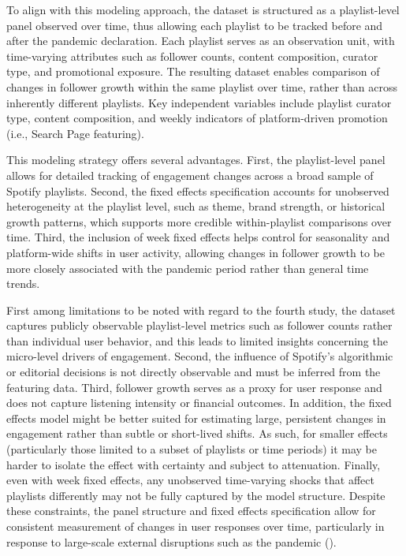 To align with this modeling approach, the dataset is structured as a playlist-level panel observed over time, thus allowing each playlist to be tracked before and after the pandemic declaration. Each playlist serves as an observation unit, with time-varying attributes such as follower counts, content composition, curator type, and promotional exposure. The resulting dataset enables comparison of changes in follower growth within the same playlist over time, rather than across inherently different playlists. Key independent variables include playlist curator type, content composition, and weekly indicators of platform-driven promotion (i.e., Search Page featuring).

This modeling strategy offers several advantages. First, the playlist-level panel allows for detailed tracking of engagement changes across a broad sample of Spotify playlists. Second, the fixed effects specification accounts for unobserved heterogeneity at the playlist level, such as theme, brand strength, or historical growth patterns, which supports more credible within-playlist comparisons over time. Third, the inclusion of week fixed effects helps control for seasonality and platform-wide shifts in user activity, allowing changes in follower growth to be more closely associated with the pandemic period rather than general time trends.

First among limitations to be noted with regard to the fourth study, the dataset captures publicly observable playlist-level metrics such as follower counts rather than individual user behavior, and this leads to limited insights concerning the micro-level drivers of engagement. Second, the influence of Spotify’s algorithmic or editorial decisions is not directly observable and must be inferred from the featuring data. Third, follower growth serves as a proxy for user response and does not capture listening intensity or financial outcomes. In addition, the fixed effects model might be better suited for estimating large, persistent changes in engagement rather than subtle or short-lived shifts. As such, for smaller effects (particularly those limited to a subset of playlists or time periods) it may be harder to isolate the effect with certainty and subject to attenuation. Finally, even with week fixed effects, any unobserved time-varying shocks that affect playlists differently may not be fully captured by the model structure. Despite these constraints, the panel structure and fixed effects specification allow for consistent measurement of changes in user responses over time, particularly in response to large-scale external disruptions such as the pandemic (\cite{Denk2022-rt,Sim2022-ns}).

